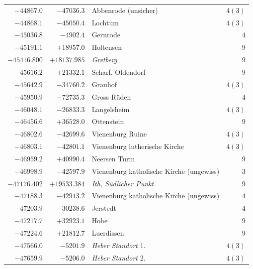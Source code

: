 \begin{center}
\begin{tabular}{r|r|p{170pt}|r}
\(-44867.0\)&\(-47036.3\)&Abbenrode (unsicher)&\(4 (3)\)\\
\(-44868.1\)&\(-45050.4\)&Lochtum&\(4 (3)\)\\
\(-45036.8\)&\(-4902.4\)&Gernrode&\(4\)\\
\(-45191.1\)&\(+18957.0\)&Holtensen&\(9\)\\
\(-45416.800\)&\(+18137.985\)&\textit{Gretberg}&\(9\)\\
\(-45616.2\)&\(+21332.1\)&Scharf. Oldendorf&\(9\)\\
\(-45642.9\)&\(-34760.2\)&Grauhof&\(4 (3)\)\\
\(-45950.9\)&\(-72735.3\)&Gross Rüden&\(4\)\\
\(-46048.1\)&\(-26833.3\)&Langelsheim&\(4 (3)\)\\
\(-46456.6\)&\(+36528.0\)&Ottenstein&\(9\)\\
\(-46802.6\)&\(-42699.6\)&Vienenburg Ruine&\(4 (3)\)\\
\(-46803.1\)&\(-42801.1\)&Vienenburg lutherische Kirche&\(4 (3)\)\\
\(-46959.2\)&\(+40990.4\)&Neersen Turm&\(9\)\\
\(-46998.9\)&\(-42597.9\)&Vienenburg katholische Kirche (ungewiss)&\(3\)\\
\(-47176.402\)&\(+19533.384\)&\textit{Ith, Südlicher Punkt}&\(9\)\\
\(-47188.3\)&\(-42913.2\)&Vienenburg katholische Kirche (ungewiss)&\(4\)\\
\(-47203.9\)&\(-30238.6\)&Jerstedt&\(4\)\\
\(-47217.7\)&\(+32923.1\)&Hohe&\(9\)\\
\(-47224.6\)&\(+21812.7\)&Luerdissen&\(9\)\\
\(-47566.0\)&\(-5201.9\)&\textit{Heber Standort} 1.&\(4 (3)\)\\
\(-47659.9\)&\(-5206.0\)&\textit{Heber Standort} 2.&\(4 (3)\)\\
\hline\end{tabular}\endgroup\end{center}
